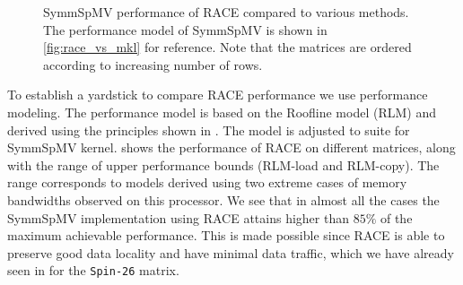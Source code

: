 \begin{figure}[tb]
	\caption{\label{fig:symm_spmv_perf} \acrshort{SymmSpMV} performance of \acrshort{RACE} compared to 
		various methods. The performance model of \acrshort{SymmSpMV} is shown in 
		\cref{fig:race_vs_mkl} for reference. Note that the matrices are ordered according 
		to increasing number of rows.}
\end{figure}
To establish a yardstick to compare \acrshort{RACE} performance we use 
performance modeling. The performance model is based on the Roofline  model (RLM)
 \cite{Williams_roofline}  and derived using the principles shown 
 in \cite{Moritz_sell}. The model is adjusted to suite for \acrshort{SymmSpMV}
kernel.  shows the performance of \acrshort{RACE}
on different matrices, along with the range of upper performance bounds 
(RLM-load and RLM-copy). The range corresponds to models derived using two
extreme cases of memory bandwidths observed on this processor. 
We see that in almost all the cases the \acrshort{SymmSpMV} implementation
using \acrshort{RACE} attains higher than $85\%$ of the maximum achievable performance.
This is made possible since \acrshort{RACE} is able to preserve good data
locality and have minimal data traffic, which we have already seen in
  for the \texttt{Spin-26} matrix. 
 
